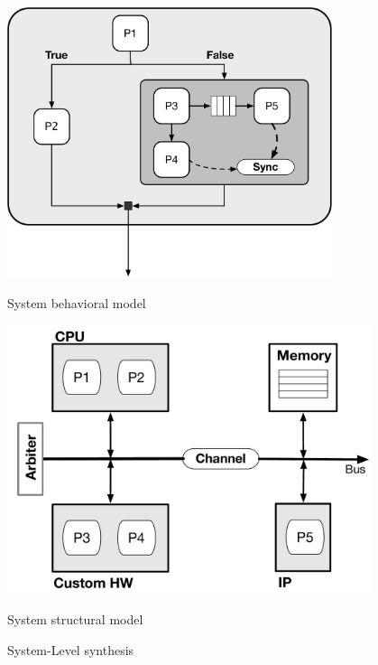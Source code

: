 \begin{figure}[!h]
    \begin{minipage}{0.5\textwidth}
       \includegraphics[width=0.85\textwidth]{figures/Introduction/Task_Graph.pdf}
       \caption{System behavioral model}
       \label{fig:task_graph}
    \end{minipage}
    \begin{minipage}{0.5\textwidth}
       \includegraphics[width=0.95\textwidth]{figures/Introduction/system_synthesis.pdf}
       \caption{System structural model}
       \label{fig:task_structure}
    \end{minipage}
    \caption{System-Level synthesis}
    \label{fig:c_example}
\end{figure}



